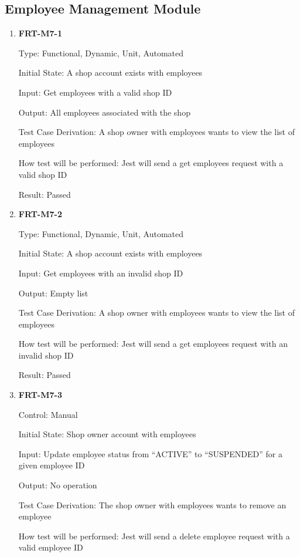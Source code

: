 \documentclass[12pt, titlepage]{article}
\begin{document}
\subsection{Employee Management Module}

\begin{enumerate}

	\item \textbf{FRT-M7-1}

	      Type: Functional, Dynamic, Unit, Automated

	      Initial State: A shop account exists with employees

	      Input: Get employees with a valid shop ID

	      Output: All employees associated with the shop

	      Test Case Derivation: A shop owner with employees wants to view the list of employees

	      How test will be performed: Jest will send a get employees request with a valid shop ID

	      Result: Passed

	\item \textbf{FRT-M7-2}

	      Type: Functional, Dynamic, Unit, Automated

	      Initial State: A shop account exists with employees

	      Input: Get employees with an invalid shop ID

	      Output: Empty list

	      Test Case Derivation: A shop owner with employees wants to view the list of employees

	      How test will be performed: Jest will send a get employees request with an invalid shop ID

	      Result: Passed

	\item \textbf{FRT-M7-3}

	      Control: Manual

	      Initial State: Shop owner account with employees

	      Input: Update employee status from ``ACTIVE'' to ``SUSPENDED'' for a given employee ID

	      Output: No operation

	      Test Case Derivation: The shop owner with employees wants to remove an employee

	      How test will be performed: Jest will send a delete employee request with a valid employee ID


\end{enumerate}
\end{document}
